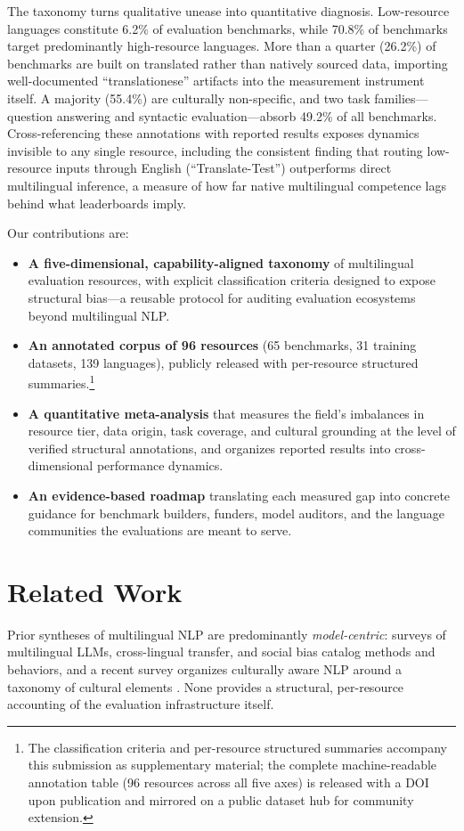 \documentclass[letterpaper]{article} %
\begin{document}
The taxonomy turns qualitative unease into quantitative diagnosis. Low-resource languages constitute 6.2\% of evaluation benchmarks, while 70.8\% of benchmarks target predominantly high-resource languages. More than a quarter (26.2\%) of benchmarks are built on translated rather than natively sourced data, importing well-documented ``translationese'' artifacts into the measurement instrument itself. A majority (55.4\%) are culturally non-specific, and two task families---question answering and syntactic evaluation---absorb 49.2\% of all benchmarks. Cross-referencing these annotations with reported results exposes dynamics invisible to any single resource, including the consistent finding that routing low-resource inputs through English (``Translate-Test'') outperforms direct multilingual inference, a measure of how far native multilingual competence lags behind what leaderboards imply.
 
Our contributions are:
\begin{itemize}\itemsep1pt\parskip0pt
\item \textbf{A five-dimensional, capability-aligned taxonomy} of multilingual evaluation resources, with explicit classification criteria designed to expose structural bias---a reusable protocol for auditing evaluation ecosystems beyond multilingual NLP.
\item \textbf{An annotated corpus of 96 resources} (65 benchmarks, 31 training datasets, 139 languages), publicly released with per-resource structured summaries.\footnote{The classification criteria and per-resource structured summaries accompany this submission as supplementary material; the complete machine-readable annotation table (96 resources across all five axes) is released with a DOI upon publication and mirrored on a public dataset hub for community extension.}
\item \textbf{A quantitative meta-analysis} that measures the field's imbalances in resource tier, data origin, task coverage, and cultural grounding at the level of verified structural annotations, and organizes reported results into cross-dimensional performance dynamics.
\item \textbf{An evidence-based roadmap} translating each measured gap into concrete guidance for benchmark builders, funders, model auditors, and the language communities the evaluations are meant to serve.
\end{itemize}

\section{Related Work}
Prior syntheses of multilingual NLP are predominantly \emph{model-centric}: surveys of multilingual LLMs, cross-lingual transfer, and social bias catalog methods and behaviors, and a recent survey organizes culturally aware NLP around a taxonomy of cultural elements \cite{liu2025culturally}. None provides a structural, per-resource accounting of the evaluation infrastructure itself.
 
\end{document}
